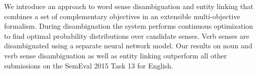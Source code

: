 We introduce an approach to word sense disambiguation and entity linking that combines a set of complementary objectives in an extensible multi-objective formalism. During disambiguation the system performs continuous optimization to find optimal probability distributions over candidate senses. Verb senses are disambiguated using a separate neural network model. Our results on noun and verb sense disambiguation as well as entity linking outperform all other submissions on the SemEval 2015 Task 13 for English.
